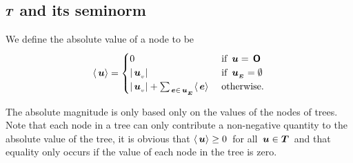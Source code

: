 \subsection{$\boldsymbol{T}$ and its seminorm}
\begin{definition}\label{absolute-mag}
 We define the absolute value of a node to be
\begin{align*}
\langle{\,\boldsymbol{u}}\rangle = \begin{cases}
  0 & \text{ if } \,\boldsymbol{u} = \,\boldsymbol{\mathsf{O}} \\
  \lvert{{\,\boldsymbol{u}}_{{}_{v}}}\rvert & \text{ if }{\,\boldsymbol{u}}_{{}_{\boldsymbol{E}}} = \emptyset \\
  \lvert{{\,\boldsymbol{u}}_{{}_{v}}}\rvert + \sum_{\,\boldsymbol{e}\in{\,\boldsymbol{u}}_{{}_{\boldsymbol{E}}}}\langle{\,\boldsymbol{e}}\rangle & \text{ otherwise.}
\end{cases}
\end{align*}
\end{definition}
The absolute magnitude is only based only on the values of the
nodes of trees. %
Note that each node in a tree can only contribute a non-negative
quantity to the absolute value of the tree, it is obvious that
\(\langle{\,\boldsymbol{u}}\rangle \geq 0\)\ for all \(\,\boldsymbol{u} \in \boldsymbol{T}\)\ and that
equality only occurs if the value of each node in the tree 
is zero.

